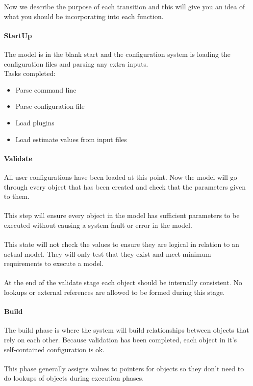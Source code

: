 Now we describe the purpose of each transition and this will give you an idea of what you should be incorporating into each function.

\paragraph*{StartUp}
The model is in the blank start and the configuration system is loading the configuration files and parsing any extra inputs.
\\
Tasks completed:
\begin{itemize}
	\item Parse command line
	\item Parse configuration file
	\item Load plugins
	\item Load estimate values from input files
\end{itemize}

\paragraph*{Validate}
All user configurations have been loaded at this point. Now the model will go through every object that has been created and check that the parameters given to them.
\\\\
This step will ensure every object in the model has sufficient parameters to be executed without causing a system fault or error in the model.
\\\\
This state will not check the values to ensure they are logical in relation to an actual model. They will only test that they exist and meet minimum requirements to execute a model.
\\\\
At the end of the validate stage each object should be internally consistent. No lookups or external references are allowed to be formed during this stage.

\paragraph*{Build}
The build phase is where the system will build relationships between objects that rely on each other. Because validation has been completed, each object in it's self-contained configuration is ok.
\\\\
This phase generally assigns values to pointers for objects so they don't need to do lookups of objects during execution phases.

